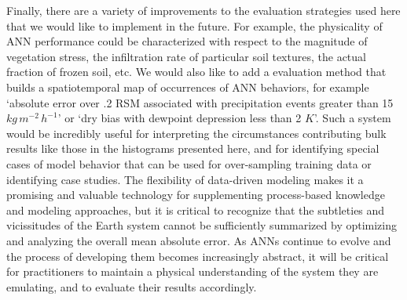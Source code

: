 Finally, there are a variety of improvements to the evaluation strategies used here that we would like to implement in the future. For example, the physicality of ANN performance could be characterized with respect to the magnitude of vegetation stress, the infiltration rate of particular soil textures, the actual fraction of frozen soil, etc. We would also like to add a evaluation method that builds a spatiotemporal map of occurrences of ANN behaviors, for example `absolute error over .2 RSM associated with precipitation events greater than 15 $kg\,m^{-2}\,h^{-1}$' or `dry bias with dewpoint depression less than 2 $K$'. Such a system would be incredibly useful for interpreting the circumstances contributing bulk results like those in the histograms presented here, and for identifying special cases of model behavior that can be used for over-sampling training data or identifying case studies. The flexibility of data-driven modeling makes it a promising and valuable technology for supplementing process-based knowledge and modeling approaches, but it is critical to recognize that the subtleties and vicissitudes of the Earth system cannot be sufficiently summarized by optimizing and analyzing the overall mean absolute error. As ANNs continue to evolve and the process of developing them becomes increasingly abstract, it will be critical for practitioners to maintain a physical understanding of the system they are emulating, and to evaluate their results accordingly.
